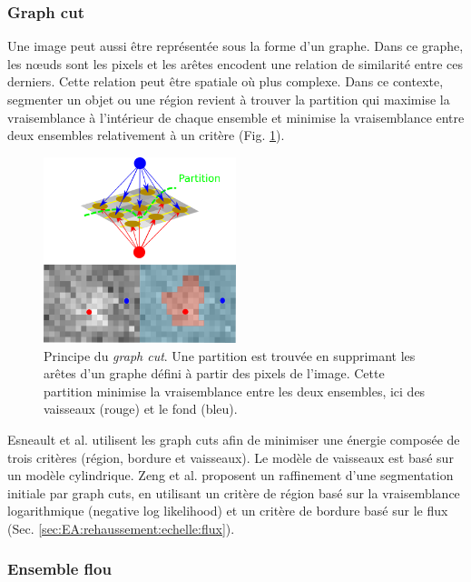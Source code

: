       \subsubsection{Graph cut}

      Une image peut aussi être représentée sous la forme d'un graphe. Dans ce graphe, les nœuds sont les pixels et les arêtes encodent une relation de similarité entre ces derniers. Cette relation peut être spatiale où plus complexe. Dans ce contexte, segmenter un objet ou une région revient à trouver la partition qui maximise la vraisemblance à l'intérieur de chaque ensemble et minimise la vraisemblance entre deux ensembles relativement à un critère (Fig. \ref{fig:graph_cut}).

      \begin{figure}[h]
        \centering
        \includegraphics[width=0.5\textwidth]{Images/graph_cut.png}
        \caption{Principe du \textit{graph cut}. Une partition est trouvée en supprimant les arêtes d'un graphe défini à partir des pixels de l'image. Cette partition minimise la vraisemblance entre les deux ensembles, ici des vaisseaux (rouge) et le fond (bleu). }
        \label{fig:graph_cut}
      \end{figure}

      Esneault et al. \cite{Esneault2009_moments_graph_cut} utilisent les graph cuts afin de minimiser une énergie composée de trois critères (région, bordure et vaisseaux). Le modèle de vaisseaux est basé sur un modèle cylindrique. Zeng et al. \cite{Zeng2017_liver_oof_graph_cut} proposent un raffinement d'une segmentation initiale par graph cuts, en utilisant un critère de région basé sur la vraisemblance logarithmique (negative log likelihood) et un critère de bordure basé sur le flux (Sec. \ref{sec:EA:rehaussement:echelle:flux}).

      \subsubsection{Ensemble flou}

